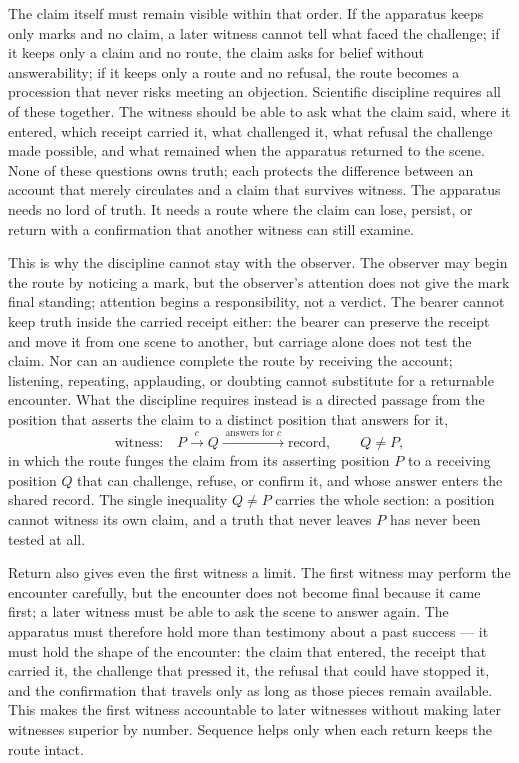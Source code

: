 The claim itself must remain visible within that order. If the apparatus keeps only marks and no claim, a later witness cannot tell what faced the challenge; if it keeps only a claim and no route, the claim asks for belief without answerability; if it keeps only a route and no refusal, the route becomes a procession that never risks meeting an objection. Scientific discipline requires all of these together. The witness should be able to ask what the claim said, where it entered, which receipt carried it, what challenged it, what refusal the challenge made possible, and what remained when the apparatus returned to the scene. None of these questions owns truth; each protects the difference between an account that merely circulates and a claim that survives witness. The apparatus needs no lord of truth. It needs a route where the claim can lose, persist, or return with a confirmation that another witness can still examine.

This is why the discipline cannot stay with the observer. The observer may begin the route by noticing a mark, but the observer's attention does not give the mark final standing; attention begins a responsibility, not a verdict. The bearer cannot keep truth inside the carried receipt either: the bearer can preserve the receipt and move it from one scene to another, but carriage alone does not test the claim. Nor can an audience complete the route by receiving the account; listening, repeating, applauding, or doubting cannot substitute for a returnable encounter. What the discipline requires instead is a directed passage from the position that asserts the claim to a distinct position that answers for it,
\[ \text{witness:}\quad P \xrightarrow{\;c\;} Q \xrightarrow{\;\text{answers for } c\;} \text{record}, \qquad Q \neq P, \]
in which the route funges the claim from its asserting position $P$ to a receiving position $Q$ that can challenge, refuse, or confirm it, and whose answer enters the shared record. The single inequality $Q \neq P$ carries the whole section: a position cannot witness its own claim, and a truth that never leaves $P$ has never been tested at all.

Return also gives even the first witness a limit. The first witness may perform the encounter carefully, but the encounter does not become final because it came first; a later witness must be able to ask the scene to answer again. The apparatus must therefore hold more than testimony about a past success --- it must hold the shape of the encounter: the claim that entered, the receipt that carried it, the challenge that pressed it, the refusal that could have stopped it, and the confirmation that travels only as long as those pieces remain available. This makes the first witness accountable to later witnesses without making later witnesses superior by number. Sequence helps only when each return keeps the route intact.

